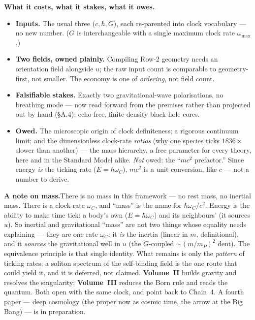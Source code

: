 \documentclass[11pt]{article}
\begin{document}
\begin{tcolorbox}
\textbf{What it costs, what it stakes, what it owes.}
\begin{itemize}[leftmargin=1.5em,itemsep=2pt,topsep=3pt]
  \item \textbf{Inputs.} The usual three ($c,\hbar,G$), each re-parented into clock vocabulary --- no
    new number. ($G$ is interchangeable with a single maximum clock rate $\omega_{\max}$.)
  \item \textbf{Two fields, owned plainly.} Compiling Row-2 geometry needs an orientation field
    alongside $u$; the raw input count is comparable to geometry-first, not smaller. The economy is
    one of \emph{ordering}, not field count.
  \item \textbf{Falsifiable stakes.} Exactly two gravitational-wave polarisations, no breathing mode ---
    now read forward from the premises rather than projected out by hand (\S A.4); echo-free,
    finite-density black-hole cores.
  \item \textbf{Owed.} The microscopic origin of clock definiteness; a
    rigorous continuum limit; and the dimensionless clock-rate \emph{ratios} (why one species ticks
    $1836\times$ slower than another) --- the mass hierarchy, a free parameter for every theory, here and
    in the Standard Model alike. \emph{Not} owed: the ``$mc^2$ prefactor.'' Since energy \emph{is} the
    ticking rate ($E=\hbar\omega_C$), $mc^2$ is a unit conversion, like $c$ --- not a number to derive.
\end{itemize}
\noindent\textbf{A note on mass.}\enspace There is no mass in this framework --- no rest mass, no
inertial mass. There is a clock rate $\omega_C$, and ``mass'' is the name for $\hbar\omega_C/c^2$.
Energy is the ability to make time tick: a body's own ($E=\hbar\omega_C$) and its neighbours'
(it sources $u$). So inertial and gravitational ``mass'' are not two things whose equality needs
explaining --- they are one rate $\omega_C$: it \emph{is} the inertia (linear in $m$, definitional), and
it \emph{sources} the gravitational well in $u$ (the $G$-coupled $\sim(m/m_P)^2$ dent). The equivalence
principle is that single identity. What remains is only the \emph{pattern} of ticking rates; a soliton
spectrum of the self-binding field is the one route that could yield it, and it is deferred, not claimed.
\noindent \textbf{Volume~II} builds gravity and resolves the singularity; \textbf{Volume~III} reduces
the Born rule and reads the quantum. Both open with the same clock, and point back to Chain~4. A fourth
paper --- deep cosmology (the proper now as cosmic time, the arrow at the Big Bang) --- is in preparation.
\end{tcolorbox}
\end{document}
